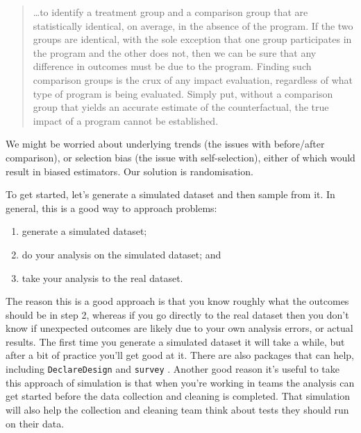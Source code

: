 \documentclass[
]{book}
\providecommand{\tightlist}{%
  \setlength{\itemsep}{0pt}\setlength{\parskip}{0pt}}
\begin{document}
\begin{quote}
\ldots to identify a treatment group and a comparison group that are statistically identical, on average, in the absence of the program. If the two groups are identical, with the sole exception that one group participates in the program and the other does not, then we can be sure that any difference in outcomes must be due to the program. Finding such comparison groups is the crux of any impact evaluation, regardless of what type of program is being evaluated. Simply put, without a comparison group that yields an accurate estimate of the counterfactual, the true impact of a program cannot be established.
\end{quote}

We might be worried about underlying trends (the issues with before/after comparison), or selection bias (the issue with self-selection), either of which would result in biased estimators. Our solution is randomisation.

To get started, let's generate a simulated dataset and then sample from it. In general, this is a good way to approach problems:

\begin{enumerate}
\def\labelenumi{\arabic{enumi}.}
\tightlist
\item
  generate a simulated dataset;
\item
  do your analysis on the simulated dataset; and
\item
  take your analysis to the real dataset.
\end{enumerate}

The reason this is a good approach is that you know roughly what the outcomes should be in step 2, whereas if you go directly to the real dataset then you don't know if unexpected outcomes are likely due to your own analysis errors, or actual results. The first time you generate a simulated dataset it will take a while, but after a bit of practice you'll get good at it. There are also packages that can help, including \texttt{DeclareDesign} \citep{citedeclaredesign} and \texttt{survey} \citep{citesurvey}. Another good reason it's useful to take this approach of simulation is that when you're working in teams the analysis can get started before the data collection and cleaning is completed. That simulation will also help the collection and cleaning team think about tests they should run on their data.
\end{document}
